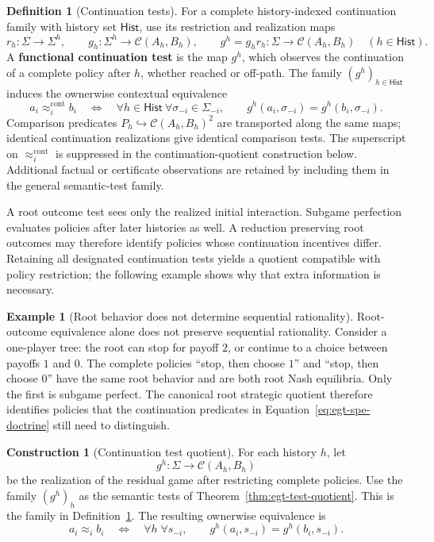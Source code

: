 \documentclass[11pt,a4paper]{article}
\numberwithin{equation}{section}
\theoremstyle{definition}
\newtheorem{definition}[theorem]{Definition}
\newtheorem{example}[theorem]{Example}
\newtheorem{construction}[construction]{Construction}
\theoremstyle{remark}
\theoremstyle{plain}
\begin{document}
\begin{definition}[Continuation tests]
\label{def:egt-continuation-test}
For a complete history-indexed continuation family with history set
$\mathsf{Hist}$, use its restriction and realization maps
\[
 r_h:\Sigma\to\Sigma^h,\qquad
 g_h:\Sigma^h\to\mathcal C(A_h,B_h),\qquad
 g^h=g_hr_h:\Sigma\to\mathcal C(A_h,B_h)
 \quad(h\in\mathsf{Hist}).
\]
A \textbf{functional continuation test} is the map $g^h$, which
observes the continuation of a complete policy after $h$, whether
reached or off-path. The family $(g^h)_{h\in\mathsf{Hist}}$ induces the
ownerwise contextual equivalence
\[
 a_i\approx_i^{\mathrm{cont}}b_i
 \quad\Longleftrightarrow\quad
 \forall h\in\mathsf{Hist}\ \forall\sigma_{-i}\in\Sigma_{-i},\qquad
 g^h(a_i,\sigma_{-i})=g^h(b_i,\sigma_{-i}).
\]
Comparison predicates $P_h\hookrightarrow\mathcal C(A_h,B_h)^2$
are transported along the same maps; identical continuation
realizations give identical comparison tests. The superscript on $\approx_i^{\mathrm{cont}}$ is suppressed
in the continuation-quotient construction below. Additional factual
or certificate observations are retained by including them in the
general semantic-test family.
\end{definition}
A root outcome test sees only the realized initial interaction.
Subgame perfection evaluates policies after later histories as well.
A reduction preserving root outcomes may therefore identify policies
whose continuation incentives differ. Retaining all designated
continuation tests yields a quotient compatible with policy restriction;
the following example shows why that extra information is necessary.

\begin{example}[Root behavior does not determine sequential rationality]
Root-outcome equivalence alone does not preserve sequential rationality.
Consider a one-player tree: the root can stop for payoff $2$, or continue to
a choice between payoffs $1$ and $0$. The complete policies ``stop, then
choose $1$'' and ``stop, then choose $0$'' have the same root behavior and
are both root Nash equilibria. Only the first is subgame perfect. The
canonical root strategic quotient therefore identifies policies that the
continuation predicates in Equation~\eqref{eq:egt-spe-doctrine} still need
to distinguish.
\end{example}

\begin{construction}[Continuation test quotient]
For each history $h$, let
\[
 g^h:\Sigma\longrightarrow\mathcal C(A_h,B_h)
\]
be the realization of the residual game after restricting complete policies.
Use the family $(g^h)_h$ as the semantic tests of
Theorem~\ref{thm:egt-test-quotient}. This is the family in
Definition~\ref{def:egt-continuation-test}. The resulting ownerwise equivalence is
\[
 a_i\approx_i b_i
 \quad\Longleftrightarrow\quad
 \forall h\;\forall s_{-i},\qquad
 g^h(a_i,s_{-i})=g^h(b_i,s_{-i}).
\]
\end{construction}
\end{document}

